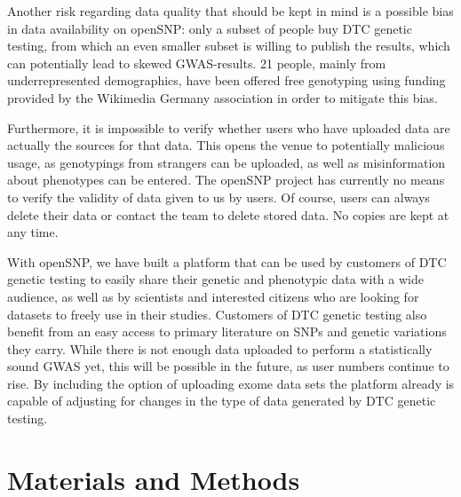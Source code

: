 \documentclass[10pt]{article}
\begin{document}
Another risk regarding data quality that should be kept in mind is a possible bias in data availability on openSNP: only a subset of people buy DTC genetic testing, from which an even smaller subset is willing to publish the results, which can potentially lead to skewed GWAS-results. 21 people, mainly from underrepresented demographics, have been offered free genotyping using funding provided by the Wikimedia Germany association in order to mitigate this bias. 

Furthermore, it is impossible to verify whether users who have uploaded data are actually the sources for that data. This opens the venue to potentially malicious usage, as genotypings from strangers can be uploaded, as well as misinformation about phenotypes can be entered. The openSNP project has currently no means to verify the validity of data given to us by users. Of course, users can always delete their data or contact the team to delete stored data. No copies are kept at any time.

With openSNP, we have built a platform that can be used by customers of DTC genetic testing to easily share their genetic and phenotypic 
data with a wide audience, as well as by scientists and interested citizens who are looking for datasets to freely use in their studies.
Customers of DTC genetic testing also benefit from an easy access to primary literature on SNPs and genetic variations they carry. 
While there is not enough data uploaded to perform a statistically sound GWAS yet, this will be possible in the future, as user numbers continue to rise. By including the option of uploading exome data sets the platform already is capable of adjusting for changes in the type of data generated by DTC genetic testing.

 
\section*{Materials and Methods}
\end{document}
